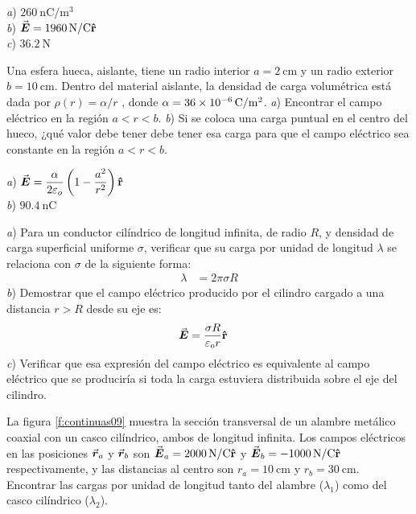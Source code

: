 \begin{Answer}
  \begin{minipage}[t]{.4\textwidth}
    \textit{a}) $\SI{260}{\nano\coulomb/\metre\cubed}$\\ \textit{b}) $\va*{E}=\SI{1960}{\newton/\coulomb}\vu{r}$\\ \textit{c}) $\SI{36.2}{\newton}$
  \end{minipage}
\end{Answer}
%
\begin{Exercise}
  Una esfera hueca, aislante, tiene un radio interior $a = \SI{2}{\centi\metre}$ y un radio exterior $b = \SI{10}{\centi\metre}$. Dentro del material aislante, la densidad de carga volumétrica está dada por $\rho(r) = \alpha/ r$ , donde $\alpha = \SI{36E-6}{\coulomb/\metre\squared}$. \textit{a}) Encontrar el campo eléctrico en la región $a < r < b$. \textit{b}) Si se coloca una carga puntual en el centro del hueco, ¿qué valor debe tener debe tener esa carga para que el campo eléctrico sea constante en la región $a < r < b$.
\end{Exercise}
\begin{Answer}
  \begin{minipage}[t]{.4\textwidth}
    \textit{a}) $\va*{E} = \dfrac{\alpha}{2\varepsilon_o}\left (1 - \dfrac{a^2}{r^2} \right )\vu{r}$\\ \textit{b}) $\SI{90.4}{\nano\coulomb}$
  \end{minipage}
\end{Answer}
%
\begin{Exercise}
  \textit{a}) Para un conductor cilíndrico de longitud infinita, de radio $R$, y densidad de carga superficial uniforme $\sigma$, verificar que su carga por unidad de longitud $\lambda$ se relaciona con $\sigma$ de la siguiente forma:
  \begin{align*}
    \lambda &= 2\pi\sigma R
  \end{align*}
  \textit{b}) Demostrar que el campo eléctrico producido por el cilindro cargado a una distancia $r > R$ desde su eje es:
  \begin{align*}
    \va*{E} &= \frac{\sigma R}{\varepsilon_o r}\vu{r}
  \end{align*}
  \textit{c}) Verificar que esa expresión del campo eléctrico es equivalente al campo eléctrico que se produciría si toda la carga estuviera distribuida sobre el eje del cilindro.
\end{Exercise}
%
\begin{Exercise}\label{p:continuas09}
  La figura \ref{f:continuas09} muestra la sección transversal de un alambre metálico coaxial con un casco cilíndrico, ambos de longitud infinita. Los campos eléctricos en las posiciones $\va*{r}_a$ y $\va*{r}_b$ son $\va*{E}_a = \SI{2000}{\newton/\coulomb}\vu{r}$ y $\va*{E}_b = \SI{-1000}{\newton/\coulomb}\vu{r}$ respectivamente, y las distancias al centro son $r_a = \SI{10}{\centi\metre}$ y $r_b = \SI{30}{\centi\metre}$. Encontrar las cargas por unidad de longitud tanto del alambre ($\lambda_1$) como del casco cilíndrico ($\lambda_2$).
\end{Exercise}
